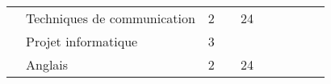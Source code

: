 \begin{tabular}{c|m{6cm}|cm{1cm}|cm{1cm}|cm{1cm}|cm{1cm}|}
 & \cellcolor{couleurClaire} \color{couleurTexte} \mbox{Techniques} \mbox{de} \mbox{communication}  & \cellcolor{couleurClaire} \color{couleurTexte} 2 & \cellcolor{couleurClaire} \color{couleurTexte}  & \cellcolor{couleurClaire} \color{couleurTexte} 24 & \cellcolor{couleurClaire} \color{couleurTexte}  \\ \cline{2-6}
 & \color{black} \mbox{Projet} \mbox{informatique}  & \color{black} 3 & \color{black}  & \color{black}  & \color{black}  \\ \cline{2-6}
 & \cellcolor{couleurClaire} \color{couleurTexte} \mbox{Anglais}  & \cellcolor{couleurClaire} \color{couleurTexte} 2 & \cellcolor{couleurClaire} \color{couleurTexte}  & \cellcolor{couleurClaire} \color{couleurTexte} 24 & \cellcolor{couleurClaire} \color{couleurTexte}  \\ \cline{2-6}
\hline
\end{tabular}
